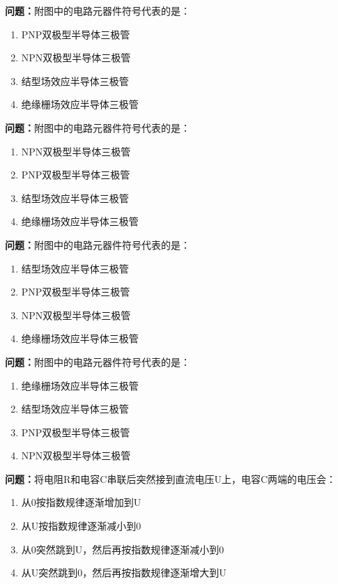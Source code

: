 \bigskip


\noindent\textbf{问题：}附图中的电路元器件符号代表的是：
\begin{enumerate}[label=\Alph*), leftmargin=3em]
\item PNP双极型半导体三极管
\item NPN双极型半导体三极管
\item 结型场效应半导体三极管
\item 绝缘栅场效应半导体三极管
\end{enumerate}

\bigskip


\noindent\textbf{问题：}附图中的电路元器件符号代表的是：
\begin{enumerate}[label=\Alph*), leftmargin=3em]
\item NPN双极型半导体三极管
\item PNP双极型半导体三极管
\item 结型场效应半导体三极管
\item 绝缘栅场效应半导体三极管
\end{enumerate}

\bigskip


\noindent\textbf{问题：}附图中的电路元器件符号代表的是：
\begin{enumerate}[label=\Alph*), leftmargin=3em]
\item 结型场效应半导体三极管
\item PNP双极型半导体三极管
\item NPN双极型半导体三极管
\item 绝缘栅场效应半导体三极管
\end{enumerate}

\bigskip


\noindent\textbf{问题：}附图中的电路元器件符号代表的是：
\begin{enumerate}[label=\Alph*), leftmargin=3em]
\item 绝缘栅场效应半导体三极管
\item 结型场效应半导体三极管
\item PNP双极型半导体三极管
\item NPN双极型半导体三极管
\end{enumerate}

\bigskip


\noindent\textbf{问题：}将电阻R和电容C串联后突然接到直流电压U上，电容C两端的电压会：
\begin{enumerate}[label=\Alph*), leftmargin=3em]
\item 从0按指数规律逐渐增加到U
\item 从U按指数规律逐渐减小到0
\item 从0突然跳到U，然后再按指数规律逐渐减小到0
\item 从U突然跳到0，然后再按指数规律逐渐增大到U
\end{enumerate}

